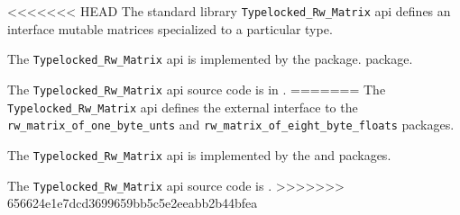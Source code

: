 
<<<<<<< HEAD
The standard library {\tt Typelocked\_Rw\_Matrix} api defines an interface mutable matrices specialized to a particular type.

The {\tt Typelocked\_Rw\_Matrix} api is implemented by the 
 package.
 package.

The {\tt Typelocked\_Rw\_Matrix} api source code is in .
=======
The {\tt Typelocked\_Rw\_Matrix} api defines the external interface to the {\tt rw\_matrix\_of\_one\_byte\_unts} and {\tt rw\_matrix\_of\_eight\_byte\_floats} packages.

The {\tt Typelocked\_Rw\_Matrix} api is implemented by the  and  packages.

The {\tt Typelocked\_Rw\_Matrix} api source code is .
>>>>>>> 656624e1e7dcd3699659bb5c5e2eeabb2b44bfea
